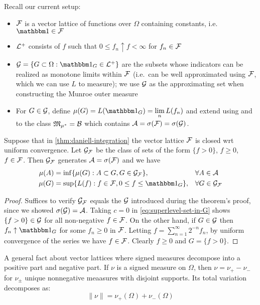 
Recall our current setup:
\begin{itemize}
  \item $\mathcal{F}$ is a vector lattice of functions over $\Omega$
    containing constants, i.e.
    $\ind \in \cF$
  \item $\mathcal{L}^+$ consists of $f$ such that $0 \leq f_n \uparrow f < \infty$
    for $f_n \in \mathcal{F}$
  \item $\cG = \{G \subset \Omega : \ind_G \in \cL^+\}$ are the subsets
    whose indicators can be realized as monotone limits within $\mathcal{F}$
    (i.e.\ can be well approximated using $\mathcal{F}$, which we can use $L$ to
    measure); we use $\mathcal{G}$ as the approximating set when constructing
    the Munroe outer measure
  \item For $G \in \mathcal{G}$, define $\mu(G) = L(\ind_G) = \lim_n L(f_n)$
    and extend using  and
    to the class $\mathfrak{M}_{\mu^*} = \mathcal{B}$ which contains
    $\mathcal{A} = \sigma(\mathcal{F}) = \sigma(\mathcal{G})$.
\end{itemize}

\begin{corollary}
  Suppose that in \cref{thm:daniell-integration} the vector lattice $\mathcal{F}$ is
  closed wrt uniform convergence.
  Let $\mathcal{G}_{\mathcal{F}}$ be the class of sets of the form
  $\{f > 0\}$, $f \geq 0$, $f \in \mathcal{F}$.
  Then $\mathcal{G}_{\mathcal{F}}$ generates $\mathcal{A} = \sigma(\mathcal{F})$ and we have
  \begin{align*}
    \mu(A) &= \inf\{\mu(G) : A \subset G, G \in \cG_\cF\}, &&\forall A \in \cA \\
    \mu(G) &= \sup\{L(f) : f \in \cF, 0 \leq f \leq \ind_G\}, &&\forall G \in \cG_\cF
  \end{align*}
\end{corollary}


\begin{proof}
  Suffices to verify $\mathcal{G}_{\mathcal{F}}$ equals the $\mathcal{G}$ introduced during the
  theorem's proof, since we showed $\sigma(\mathcal{G}) = \mathcal{A}$.
  Taking $c=0$ in \cref{eq:superlevel-set-in-G} shows
  $\{f > 0\} \in \mathcal{G}$ for all non-negative $f \in \mathcal{F}$.
  On the other hand, if $G \in \mathcal{G}$ then $f_n \uparrow \ind_G$
  for some $f_n \geq 0$ in $\mathcal{F}$. Letting $f = \sum_{n=1}^\infty 2^{-n} f_n$,
  by uniform convergence of the series we have $f \in \mathcal{F}$.
  Clearly $f \geq 0$ and $G = \{f > 0\}$.
\end{proof}

A general fact about vector lattices where signed measures decompose into
a positive part and negative part. If $\nu$ is a signed measure on $\Omega$,
then $\nu = \nu_+ - \nu_-$ for $\nu_{\pm}$ unique nonnegative meaasures with
disjoint supports. Its total variation decomposes as:
\[
  \|\nu\| = \nu_+(\Omega) + \nu_-(\Omega)
\]

